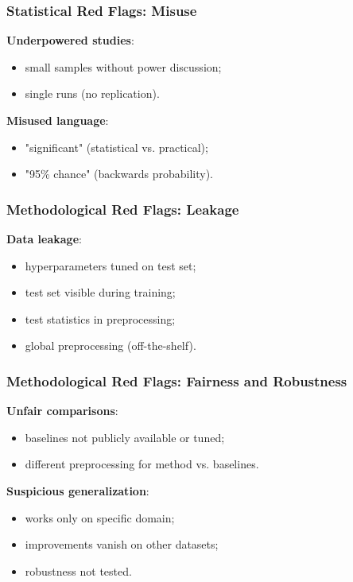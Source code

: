 \documentclass[]{beamer}
\begin{document}
\begin{frame}[fragile]
\frametitle{Statistical Red Flags: Misuse}
\textbf{Underpowered studies}:
\begin{itemize}
  \item small samples without power discussion;
  \item single runs (no replication).
\end{itemize}

\textbf{Misused language}:
\begin{itemize}
  \item "significant" (statistical vs. practical);
  \item "95\% chance" (backwards probability).
\end{itemize}

\end{frame}

\begin{frame}[fragile]
\frametitle{Methodological Red Flags: Leakage}
\textbf{Data leakage}:
\begin{itemize}
  \item hyperparameters tuned on test set;
  \item test set visible during training;
  \item test statistics in preprocessing;
  \item global preprocessing (off-the-shelf).
\end{itemize}

\end{frame}

\begin{frame}[fragile]
\frametitle{Methodological Red Flags: Fairness and Robustness}
\textbf{Unfair comparisons}:
\begin{itemize}
  \item baselines not publicly available or tuned;
  \item different preprocessing for method vs. baselines.
\end{itemize}

\textbf{Suspicious generalization}:
\begin{itemize}
  \item works only on specific domain;
  \item improvements vanish on other datasets;
  \item robustness not tested.
\end{itemize}

\end{frame}
\end{document}
